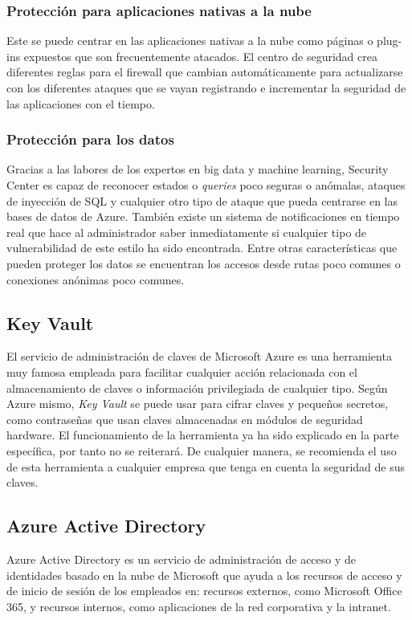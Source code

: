 \documentclass{article}
\begin{document}
\subsubsection*{Protección para aplicaciones nativas a la nube}
Este se puede centrar en las aplicaciones nativas a la nube como páginas o
plug-ins expuestos que son frecuentemente atacados. El centro de seguridad crea
diferentes reglas para el firewall que cambian automáticamente para actualizarse
con los diferentes ataques que se vayan registrando e incrementar la seguridad
de las aplicaciones con el tiempo.

\subsubsection*{Protección para los datos}
Gracias a las labores de los expertos en big data y machine learning, Security
Center es capaz de reconocer estados o \textit{queries} poco seguras o anómalas,
ataques de inyección de SQL y cualquier otro tipo de ataque que pueda centrarse
en las bases de datos de Azure. También existe un sistema de notificaciones en
tiempo real que hace al administrador saber inmediatamente si cualquier tipo de
vulnerabilidad de este estilo ha sido encontrada. Entre otras características
que pueden proteger los datos se encuentran los accesos desde rutas poco comunes
o conexiones anónimas poco comunes.

\subsection*{Key Vault}

El servicio de administración de claves de Microsoft Azure es una herramienta
muy famosa empleada para facilitar cualquier acción relacionada con el
almacenamiento de claves o información privilegiada de cualquier tipo. Según
Azure mismo, \textit{Key Vault} se puede usar para cifrar claves y pequeños
secretos, como contraseñas que usan claves almacenadas en módulos de seguridad
hardware. El funcionamiento de la herramienta ya ha sido explicado en la parte
específica, por tanto no se reiterará. De cualquier manera, se recomienda el uso
de esta herramienta a cualquier empresa que tenga en cuenta la seguridad de sus
claves.

\subsection*{Azure Active Directory}
Azure Active Directory es un servicio de administración de acceso y de
identidades basado en la nube de Microsoft que ayuda a los recursos de acceso y
de inicio de sesión de los empleados en: recursos externos, como Microsoft
Office 365, y recursos internos, como aplicaciones de la red corporativa y la
intranet.
\end{document}
